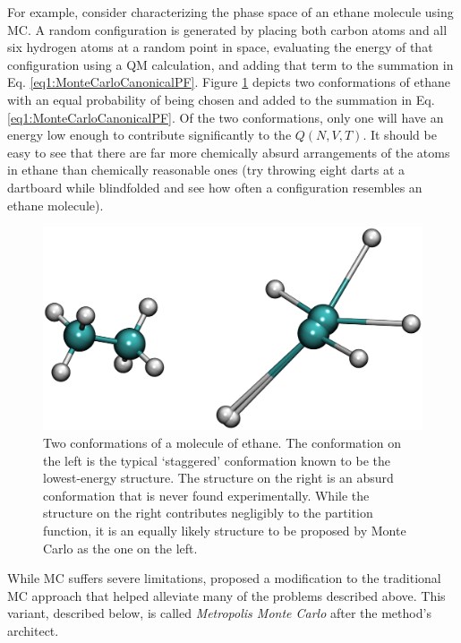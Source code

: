 For example, consider characterizing the phase space of an ethane molecule using
MC. A random configuration is generated by placing both carbon atoms and all six
hydrogen atoms at a random point in space, evaluating the energy of that
configuration using a QM calculation, and adding that term to the summation in
Eq. \ref{eq1:MonteCarloCanonicalPF}. Figure \ref{fig1:EthaneMC} depicts two
conformations of ethane with an equal probability of being chosen and added to
the summation in Eq. \ref{eq1:MonteCarloCanonicalPF}. Of the two conformations,
only one will have an energy low enough to contribute significantly to the $Q(N,
V, T)$. It should be easy to see that there are far more chemically absurd
arrangements of the atoms in ethane than chemically reasonable ones (try
throwing eight darts at a dartboard while blindfolded and see how often a
configuration resembles an ethane molecule).

\begin{figure}
   \includegraphics[width=6.5in]{EthaneMC.ps}
   \caption{Two conformations of a molecule of ethane. The conformation on the
            left is the typical `staggered' conformation known to be the
            lowest-energy structure. The structure on the right is an absurd
            conformation that is never found experimentally. While the structure
            on the right contributes negligibly to the partition function, it is
            an equally likely structure to be proposed by Monte Carlo as the one
            on the left.}
   \label{fig1:EthaneMC}
\end{figure}

While MC suffers severe limitations,
\citeauthor{Metropolis_JChemPhys_1953_v21_p1087} proposed a modification to the
traditional MC approach that helped alleviate many of the problems described
above. \cite{Metropolis_JChemPhys_1953_v21_p1087} This variant, described below,
is called \emph{Metropolis Monte Carlo} after the method's architect.

